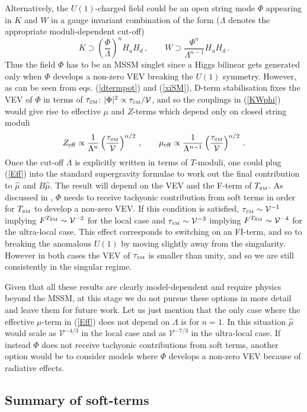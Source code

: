 \documentclass[11pt,a4paper]{article}
\newcommand{\be}{\begin{equation}}
\newcommand{\ee}{\end{equation}}
\def\SM{{\scriptscriptstyle \rm SM}}
\newcommand\vo{{\mathcal{V}}}
\begin{document}
Alternatively, the $U(1)$-charged field could be an open string mode $\Phi$ appearing in $K$ and $W$
in a gauge invariant combination of the form ($\Lambda$ denotes the appropriate moduli-dependent cut-off)
\be
K\supset \left(\frac{\Phi}{\Lambda}\right)^n H_u H_d\,,\quad \quad W\supset\frac{\Phi^n}{\Lambda^{n-1}} H_u H_d\,.
\label{KWphi}
\ee
Thus the field $\Phi$ has to be an MSSM singlet since a Higgs bilinear gets generated only when $\Phi$ develops a non-zero VEV breaking the $U(1)$ symmetry.
However, as can be seen from eqs. (\ref{dtermpot}) and (\ref{xiSM}), D-term stabilisation fixes the VEV of $\Phi$
in terms of $\tau_\SM$: $|\Phi|^2 \propto \tau_\SM/\vo$,
and so the couplings in (\ref{KWphi}) would give rise to effective $\mu$ and $Z$-terms which depend only on closed string moduli
\be
Z_{\rm eff}\propto \frac{1}{\Lambda^n}\left(\frac{\tau_\SM}{\vo}\right)^{n/2}\,,
\quad \quad\mu_{\rm eff}\propto \frac{1}{\Lambda^{n-1}}\left(\frac{\tau_\SM}{\vo}\right)^{n/2}\,.
\label{Eff}
\ee
Once the cut-off $\Lambda$ is explicitly written in terms of $T$-moduli, one could plug (\ref{Eff})
into the standard supergravity formulae to work out the final contribution to $\hat\mu$ and $B\hat\mu$.
The result will depend on the VEV and the F-term of $T_\SM$. As discussed in \cite{Cicoli:2013cha},
$\Phi$ needs to receive tachyonic contribution from soft terms in order for $T_\SM$ to develop a non-zero VEV.
If this condition is satisfied, $\tau_\SM \sim \vo^{-1}$ implying $F^{T_\SM}\sim \vo^{-2}$ for the local case
and $\tau_\SM \sim \vo^{-3}$ implying $F^{T_\SM}\sim \vo^{-4}$ for the ultra-local case.
This effect corresponds to switching on an FI-term, and so to breaking the anomalous $U(1)$ by moving slightly away from the singularity.
However in both cases the VEV of $\tau_\SM$ is smaller than unity, and so we are still consistently in the singular regime.

Given that all these results are clearly model-dependent and require physics beyond the MSSM,
at this stage we do not pursue these options in more detail and leave them for future work.
Let us just mention that the only case where the effective $\mu$-term in (\ref{Eff}) does not
depend on $\Lambda$ is for $n=1$. In this situation $\hat\mu$ would scale as $\vo^{-4/3}$ in the local case and as $\vo^{-7/3}$ in the ultra-local case.
If instead $\Phi$ does not receive tachyonic contributions from soft terms,
another option would be to consider models where $\Phi$ develops a non-zero VEV because of radiative effects.

\subsection{Summary of soft-terms}
\end{document}
